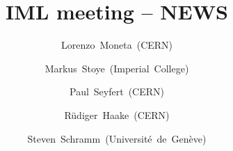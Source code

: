 \author[~]{Lorenzo~Moneta~(CERN)\and
 Markus~Stoye~(Imperial~College)\and
 Paul~Seyfert~(CERN)\and
 Rüdiger~Haake~(CERN)\and
 Steven~Schramm~(Université~de~Genève)}
\institute[]{}
\date[\today]{}
\title{IML meeting -- NEWS}
